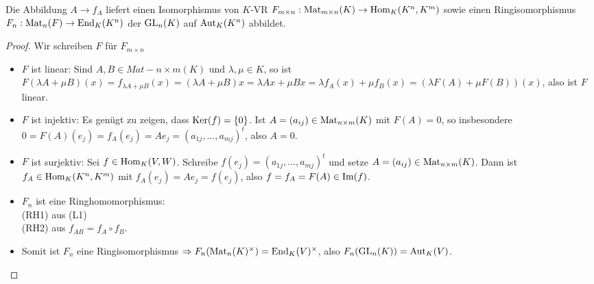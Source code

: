 \begin{proposition}
	Die Abbildung $A\to f_A$ liefert einen Isomorphismus von $K$-VR $F_{m\times n}: \operatorname{Mat}_{m\times n}(K)
	\to \operatorname{Hom}_K(K^n,K^m)$ sowie einen Ringisomorphismus $F_n:\operatorname{Mat}_n(F)\to \operatorname{End}_K(K^n)$ der $\operatorname{GL}_n(K)$ auf $\operatorname{Aut}_K(K^n)$ 
	abbildet.
\end{proposition}
\begin{proof}
	Wir schreiben $F$ für $F_{m\times n}$
	\begin{itemize}
		\item $F$ ist linear: Sind $A,B\in Mat-{n\times m}(K)$ und $\lambda,\mu\in K$, so ist $F(\lambda A+\mu B)(x)=
		f_{\lambda A+\mu B}(x)=(\lambda A+\mu B)x=\lambda Ax+\mu Bx=\lambda f_A(x)+\mu f_B(x)=(\lambda F(A)+\mu F(B))(x)$, 
		also ist $F$ linear.
		\item $F$ ist injektiv: Es genügt zu zeigen, dass $\operatorname{Ker}(f)=\{0\}$. Ist $A=(a_{ij})\in \operatorname{Mat}_{n\times m}(K)$ mit $F(A)=0$, 
		so insbesondere $0=F(A)(e_j)=f_A(e_j)=Ae_j=(a_{1j},...,a_{mj})^t$, also $A=0$.
		\item $F$ ist surjektiv: Sei $f\in \operatorname{Hom}_K(V,W)$. Schreibe $f(e_j)=(a_{1j},...,a_{mj})^t$ und setze $A=(a_{ij})\in 
		\operatorname{Mat}_{n\times m}(K)$. Dann ist $f_A\in \operatorname{Hom}_K(K^n,K^m)$ mit $f_A(e_j)=Ae_j=f(e_j)$, also $f=f_A=F(A)\in \operatorname{Im}(f)$.
		\item $F_n$ ist eine Ringhomomorphismus: \\
		(RH1) aus (L1) \\
		(RH2) aus $f_{AB}=f_A\circ f_B$.
		\item Somit ist $F_n$ eine Ringisomorphismus $\Rightarrow F_n(\operatorname{Mat}_n(K)^{\times})=\operatorname{End}_K(V)^{\times}$, also $F_n(
		\operatorname{GL}_n(K))=\operatorname{Aut}_K(V)$.
	\end{itemize}
\end{proof}